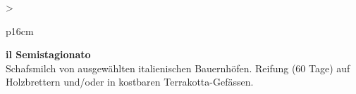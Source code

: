 \documentclass[
  beamerpaper,
  DIV=11,
  numbers=noendperiod,
  aspectratio=54]{scrreprt}
\begin{document}
\begin{table}

\caption{\label{tbl-panel-cheese2}Pecorino}\begin{minipage}[t]{\linewidth}

\tabularnewline

\fontsize{16}{18}\selectfont
\begin{tabular}{>{\raggedright\arraybackslash}p{16cm}}
\toprule
\begingroup\fontsize{18}{20}\selectfont \textbf{il Semistagionato}\endgroup\\
\midrule
Schafsmilch von ausgewählten italienischen Bauernhöfen. Reifung (60 Tage) auf Holzbrettern und/oder in kostbaren Terrakotta-Gefässen.\\
\bottomrule
\end{tabular}

\end{minipage}%
\newline
\begin{minipage}[t]{\linewidth}


\end{minipage}%

\end{table}
\end{document}
